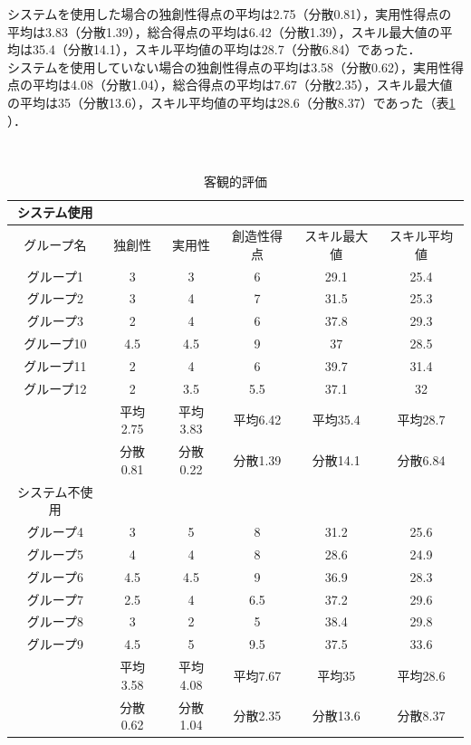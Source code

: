\documentclass{funthesis}
\begin{document}
システムを使用した場合の独創性得点の平均は2.75（分散0.81），実用性得点の平均は3.83（分散1.39），総合得点の平均は6.42（分散1.39），スキル最大値の平均は35.4（分散14.1），スキル平均値の平均は28.7（分散6.84）であった．\\
システムを使用していない場合の独創性得点の平均は3.58（分散0.62），実用性得点の平均は4.08（分散1.04），総合得点の平均は7.67（分散2.35），スキル最大値の平均は35（分散13.6），スキル平均値の平均は28.6（分散8.37）であった（表\ref{客観的評価}\\）．

\ 
\begin{table}[H]
\begin{center}

  \caption{客観的評価}
  \begin{tabular}{cccccc} \hline
  システム使用\tabularnewline \hline
  グループ名&独創性&実用性&創造性得点
  &スキル最大値 & スキル平均値\tabularnewline \hline
    グループ1&3&3&6&29.1 &25.4\tabularnewline
    グループ2&3&4&7& 31.5&25.3 \tabularnewline
    グループ3&2&4&6 &37.8&29.3\tabularnewline
    グループ10&4.5&4.5&9&37&28.5 \tabularnewline
    グループ11&2&4&6&39.7&31.4 \tabularnewline
    グループ12&2&3.5&5.5&37.1&32 \tabularnewline \hline 
     &平均2.75&平均3.83&平均6.42&平均35.4&平均28.7\tabularnewline
    &分散0.81&分散0.22&分散1.39&分散14.1&分散6.84\tabularnewline 
      \hline \hline 
   システム不使用\tabularnewline \hline 
    グループ4&3&5&8&31.2&25.6 \tabularnewline
    グループ5&4&4&8&28.6&24.9 \tabularnewline
    グループ6&4.5&4.5&9 &36.9&28.3\tabularnewline
    グループ7&2.5&4&6.5&37.2&29.6 \tabularnewline
    グループ8&3&2&5 &38.4&29.8\tabularnewline
    グループ9&4.5&5&9.5&37.5&33.6 \tabularnewline
         \hline
         &平均3.58&平均4.08&平均7.67&平均35&平均28.6\tabularnewline 
    &分散0.62&分散1.04&分散2.35&分散13.6&分散8.37\tabularnewline \hline
  \end{tabular}
  \label{客観的評価}
  \end{center}
\end{table}
\end{document}
